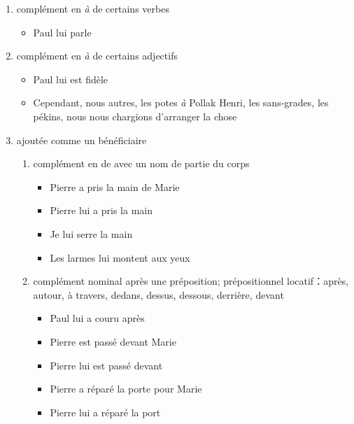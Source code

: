 \documentclass[UTF8]{report}
\begin{document}
\begin{enumerate}
    \item complément en \emph{à} de certains verbes
    \begin{itemize}
        \item Paul lui parle
    \end{itemize}
    \item complément en \emph{à} de certains adjectifs
    \begin{itemize}
        \item Paul lui est fidèle
        \item Cependant, nous autres, les potes \emph{à} Pollak Henri, les sans-grades, les pékins, nous nous chargions d’arranger la chose
    \end{itemize}
    \item ajoutée comme un bénéficiaire
    \begin{enumerate}
        \item complément en de avec un nom de partie du corps
        \begin{itemize}
            \item Pierre a pris la main de Marie
            \item Pierre lui a pris la main
            \item Je lui serre la main
            \item Les larmes lui montent aux yeux
        \end{itemize}
        \item complément nominal après une préposition; prépositionnel locatif：après, autour, à travers, dedans, dessus, dessous, derrière, devant
        \begin{itemize}
            \item Paul lui a couru après
            \item Pierre est passé devant Marie
            \item Pierre lui est passé devant
            \item Pierre a réparé la porte pour Marie
            \item Pierre lui a réparé la port
        \end{itemize}
    \end{enumerate}
\end{enumerate}
\end{document}
